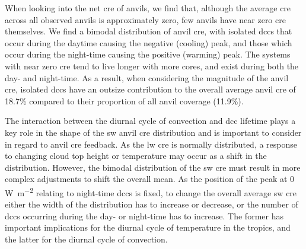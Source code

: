 When looking into the net \acrshort{cre} of anvils, we find that, although the
average \acrshort{cre} across all observed anvils is approximately zero, few anvils
have near zero \acrshort{cre} themselves. We find a bimodal distribution of anvil
\acrshort{cre}, with isolated \acrshort{dcc}s that occur during the daytime causing the
negative (cooling) peak, and those which occur during the night-time
causing the positive (warming) peak. The systems with near zero \acrshort{cre} tend
to live longer with more cores, and exist during both the day- and
night-time. As a result, when considering the magnitude of the anvil
\acrshort{cre}, isolated \acrshort{dcc}s have an outsize contribution to the overall average
anvil \acrshort{cre} of 18.7\% compared to their proportion of all anvil coverage
(11.9\%).

The interaction between the diurnal cycle of convection and \acrshort{dcc} lifetime
plays a key role in the shape of the \acrshort{sw} anvil \acrshort{cre} distribution and is
important to consider in regard to anvil \acrshort{cre} feedback. As the \acrshort{lw} \acrshort{cre} is
normally distributed, a response to changing cloud top height or
temperature may occur as a shift in the distribution. However, the
bimodal distribution of the \acrshort{sw} \acrshort{cre} must result in more complex
adjustments to shift the overall mean. As the position of the peak at 0
\,\unit{W m^{-2}} relating to night-time \acrshort{dcc}s is fixed, to change
the overall average \acrshort{sw} \acrshort{cre} either the width of the distribution has to
increase or decrease, or the number of \acrshort{dcc}s occurring during the day- or
night-time has to increase. The former has important implications for
the diurnal cycle of temperature in the tropics, and the latter for the
diurnal cycle of convection.

